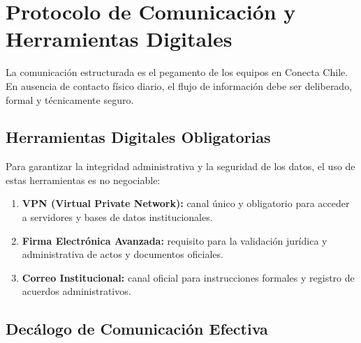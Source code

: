 \documentclass[11pt,letterpaper]{article}
\newcommand{\strong}[1]{\textbf{\textcolor{AzulProfundo}{#1}}}
\begin{document}
\section{Protocolo de Comunicación y Herramientas Digitales}

La comunicación estructurada es el pegamento de los equipos en Conecta Chile. En ausencia de contacto físico diario, el flujo de información debe ser deliberado, formal y técnicamente seguro.

\subsection{Herramientas Digitales Obligatorias}

Para garantizar la integridad administrativa y la seguridad de los datos, el uso de estas herramientas es no negociable:

\begin{enumerate}
    \item \strong{VPN (Virtual Private Network):} canal único y obligatorio para acceder a servidores y bases de datos institucionales.
    \item \strong{Firma Electrónica Avanzada:} requisito para la validación jurídica y administrativa de actos y documentos oficiales.
    \item \strong{Correo Institucional:} canal oficial para instrucciones formales y registro de acuerdos administrativos.
\end{enumerate}

\subsection{Decálogo de Comunicación Efectiva}
\end{document}
